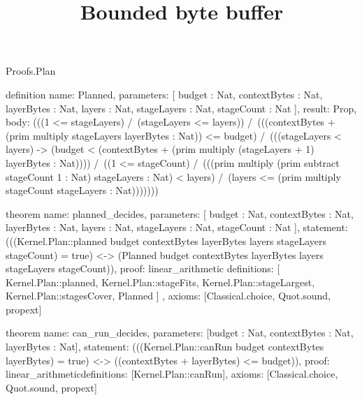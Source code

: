 \begin{lexlean}{Proofs.Plan}
\title{Bounded byte buffer}
\begin{semanticmodule}
definition{
  name: Planned,
  parameters: [
    budget : Nat,
    contextBytes : Nat,
    layerBytes : Nat,
    layers : Nat,
    stageLayers : Nat,
    stageCount : Nat
  ],
  result: Prop,
  body: (((1 <= stageLayers) /\ (stageLayers <= layers)) /\ (((contextBytes + (prim multiply stageLayers layerBytes : Nat)) <= budget) /\ (((stageLayers < layers) -> (budget < (contextBytes + (prim multiply (stageLayers + 1) layerBytes : Nat)))) /\ ((1 <= stageCount) /\ (((prim multiply (prim subtract stageCount 1 : Nat) stageLayers : Nat) < layers) /\ (layers <= (prim multiply stageCount stageLayers : Nat)))))))
}

theorem{
  name: planned_decides,
  parameters: [
    budget : Nat,
    contextBytes : Nat,
    layerBytes : Nat,
    layers : Nat,
    stageLayers : Nat,
    stageCount : Nat
  ],
  statement: (((Kernel.Plan::planned budget contextBytes layerBytes layers stageLayers stageCount) = true) <-> (Planned budget contextBytes layerBytes layers stageLayers stageCount)),
  proof: linear_arithmetic{
    definitions: [
      Kernel.Plan::planned,
      Kernel.Plan::stageFits,
      Kernel.Plan::stageLargest,
      Kernel.Plan::stagesCover,
      Planned
    ]
  },
  axioms: [Classical.choice, Quot.sound, propext]
}

theorem{
  name: can_run_decides,
  parameters: [budget : Nat, contextBytes : Nat, layerBytes : Nat],
  statement: (((Kernel.Plan::canRun budget contextBytes layerBytes) = true) <-> ((contextBytes + layerBytes) <= budget)),
  proof: linear_arithmetic{definitions: [Kernel.Plan::canRun]},
  axioms: [Classical.choice, Quot.sound, propext]
}
\end{semanticmodule}
\end{lexlean}
